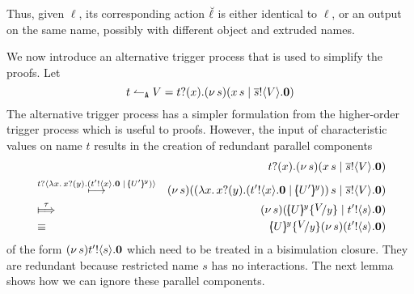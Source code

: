 Thus, given $\ell$, its corresponding action $\breve{\ell}$ is either identical to $\ell$, or an output on the same name, possibly with different object and extruded names.

We now introduce an alternative trigger process
that is used to simplify the proofs. Let
\begin{equation}
	t \leftharpoonup_\mathtt{A} V = t ? (x) . (\nu\, s)(x\, {s} \;|\; \overline{s} ! \langle V \rangle . \mathbf{0})
	\label{eq:ntrig}
\end{equation}
The alternative trigger process has a simpler formulation
from the higher-order trigger process which is useful to proofs.
However, the input of characteristic values on name $t$
results in the creation of redundant parallel components
\begin{eqnarray*}
	&&\newtrigger{t}{V}\\
	&\hby{\bactinp{t}{ \abs{x}{\binp{x}{y} (\bout{t'}{x} \inact \Par \mapchar{U'}{y} )  }} }&
	\newsp{s}{\appl{(\abs{x}{\binp{x}{y} (\bout{t'}{x} \inact \Par \mapchar{U'}{y} ))}}{s} \Par \bout{\dual{s}}{V} \inact}\\
	&\Hby{\tau}
	&\newsp{s}{\mapchar{U}{y} \subst{V}{y} \Par \bout{t'}{s} \inact } \\
	&\scong&
	\mapchar{U}{y} \subst{V}{y} \newsp{s}{\bout{t'}{s} \inact}
\end{eqnarray*}
of the form $(\nu\, s){t' ! \langle s \rangle . \mathbf{0}}$ which need to
be treated in a bisimulation closure. They are redundant because restricted name $s$ has no interactions. The next
lemma shows how we can ignore these parallel components. 

